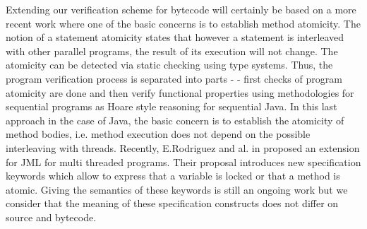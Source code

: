 Extending our verification scheme for bytecode will certainly be based on a more recent work  where one of the basic concerns is to establish method atomicity. 
The notion of a statement atomicity states  that however a statement is interleaved with other parallel programs, the result of its execution will not change.
The atomicity can be  detected via static checking \cite{TES03CF} using type systems. Thus, the program verification process is separated into parts -
- first checks of program atomicity  \cite{TES03CF} are done  and then verify functional properties using  methodologies for sequential programs as Hoare style reasoning for sequential Java. 
In this last approach in the case of Java, the basic concern is to establish the atomicity of method bodies, i.e. method 
execution does not depend on the possible interleaving with threads.
Recently, E.Rodriguez and al. in \cite{RodriguezDFHLR05} proposed an extension for JML for multi threaded
 programs. Their proposal introduces  new specification keywords which allow to express that a variable is locked or
 that a method is atomic. Giving the semantics of these keywords is still an ongoing work but we consider that
 the meaning of these specification constructs does not differ on source and bytecode. 
    
 



